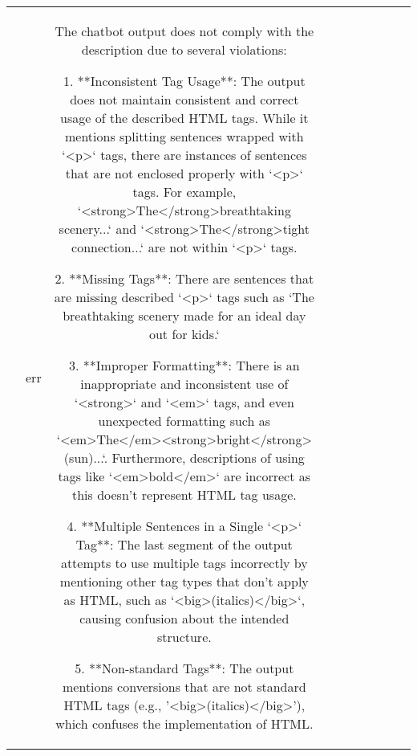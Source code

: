 \begin{table}[h!]
\begin{tabular}{|c|c|c|c|c|c|c|c|c|c|}
{{However, there were a couple of sentences which did not contain emphasized words/Phrases, so some rephrasing has been done to that paragraph
<p>Children enjoyed playing on the <strong>swings</strong> and riding the <em>slides</em> on a warm sunny day in the park.</p>
<strong>The</strong><strong>bright</strong>(sun) was shining down on everyone as the children played together, free from worry about getting too muddy or tired.<br></strong><p>The beautiful scenery made for an ideal day out for kids.</p>

This will be modified to have <em>bold</em>, <big>(italics)</big>, <small>(underlined)</small> tags to make the emphasis clear
<p>Children enjoyed playing on the swings and riding the slides on a warm sunny day in the park.</p>
<em>The</em><strong>bright</strong>(sun) was shining down on everyone as the children played together, free from worry about getting too muddy or tired.<br></em><p>The beautiful scenery made for an ideal day out for kids.</p> & err & The chatbot output does not comply with the description due to several violations:

1. **Inconsistent Tag Usage**: The output does not maintain consistent and correct usage of the described HTML tags. While it mentions splitting sentences wrapped with `<p>` tags, there are instances of sentences that are not enclosed properly with `<p>` tags. For example, `<strong>The</strong>breathtaking scenery...` and `<strong>The</strong>tight connection...` are not within `<p>` tags.

2. **Missing Tags**: There are sentences that are missing described `<p>` tags such as `The breathtaking scenery made for an ideal day out for kids.`

3. **Improper Formatting**: There is an inappropriate and inconsistent use of `<strong>` and `<em>` tags, and even unexpected formatting such as `<em>The</em><strong>bright</strong>(sun)...`. Furthermore, descriptions of using tags like `<em>bold</em>` are incorrect as this doesn’t represent HTML tag usage.

4. **Multiple Sentences in a Single `<p>` Tag**: The last segment of the output attempts to use multiple tags incorrectly by mentioning other tag types that don't apply as HTML, such as `<big>(italics)</big>`, causing confusion about the intended structure.

5. **Non-standard Tags**: The output mentions conversions that are not standard HTML tags (e.g., '<big>(italics)</big>'), which confuses the implementation of HTML.

}}
\end{tabular}
\end{table}
